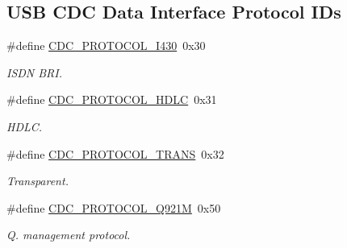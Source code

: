 \subsection*{U\+SB C\+DC Data Interface Protocol I\+Ds}
\begin{DoxyCompactItemize}
\item 
\mbox{\label{group__cdc__protocol__group_ga34f6a52b0c21cc0df8558a89ab6244aa}} 
\#define \hyperlink{group__cdc__protocol__group_ga34f6a52b0c21cc0df8558a89ab6244aa}{C\+D\+C\+\_\+\+P\+R\+O\+T\+O\+C\+O\+L\+\_\+\+I430}~0x30
\begin{DoxyCompactList}\small\item\em I\+S\+DN B\+RI. \end{DoxyCompactList}\item 
\mbox{\label{group__cdc__protocol__group_gaf4adc6afe3a8d15272d6063942fe1b1d}} 
\#define \hyperlink{group__cdc__protocol__group_gaf4adc6afe3a8d15272d6063942fe1b1d}{C\+D\+C\+\_\+\+P\+R\+O\+T\+O\+C\+O\+L\+\_\+\+H\+D\+LC}~0x31
\begin{DoxyCompactList}\small\item\em H\+D\+LC. \end{DoxyCompactList}\item 
\mbox{\label{group__cdc__protocol__group_ga23a4cfd8c12e8d75a57bda51845abc0a}} 
\#define \hyperlink{group__cdc__protocol__group_ga23a4cfd8c12e8d75a57bda51845abc0a}{C\+D\+C\+\_\+\+P\+R\+O\+T\+O\+C\+O\+L\+\_\+\+T\+R\+A\+NS}~0x32
\begin{DoxyCompactList}\small\item\em Transparent. \end{DoxyCompactList}\item 
\mbox{\label{group__cdc__protocol__group_ga304da80f158210479728ae1158f48498}} 
\#define \hyperlink{group__cdc__protocol__group_ga304da80f158210479728ae1158f48498}{C\+D\+C\+\_\+\+P\+R\+O\+T\+O\+C\+O\+L\+\_\+\+Q921M}~0x50
\begin{DoxyCompactList}\small\item\em Q. management protocol. \end{DoxyCompactList}\item 
\mbox{\label{group__cdc__protocol__group_gab4efd3c7d98b5d12bf01238259a50707}} 

\end{DoxyCompactItemize}
